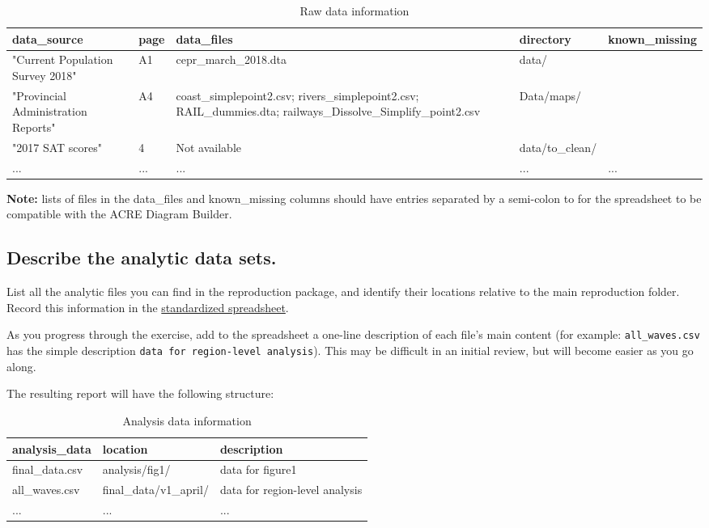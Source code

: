 \documentclass[]{book}
\begin{document}
\begin{table}

\caption{\label{tab:raw-data-information}Raw data information}
\centering
\begin{tabu} to 
\hline
data\_source & page & data\_files & directory & known\_missing\\
\hline
"Current Population Survey 2018" & A1 & cepr\_march\_2018.dta & data/ & \\
\hline
"Provincial Administration Reports" & A4 & coast\_simplepoint2.csv; rivers\_simplepoint2.csv; RAIL\_dummies.dta; railways\_Dissolve\_Simplify\_point2.csv & Data/maps/ & \\
\hline
"2017 SAT scores" & 4 & Not available & data/to\_clean/ & \\
\hline
... & ... & ... & ... & ...\\
\hline
\end{tabu}
\end{table}

\textbf{Note:} lists of files in the data\_files and known\_missing columns should have entries separated by a semi-colon to for the spreadsheet to be compatible with the ACRE Diagram Builder.

\hypertarget{desc-analy}{%
\subsection{Describe the analytic data sets.}\label{desc-analy}}

List all the analytic files you can find in the reproduction package, and identify their locations relative to the main reproduction folder. Record this information in the \href{https://docs.google.com/spreadsheets/d/1LUIdVFH0OfR70C7z07TYeE-uWzKI_JIeWUMaYhqEKK0/edit\#gid=1299317837\&range=A1}{standardized spreadsheet}.

As you progress through the exercise, add to the spreadsheet a one-line description of each file's main content (for example: \texttt{all\_waves.csv} has the simple description \texttt{data\ for\ region-level\ analysis}). This may be difficult in an initial review, but will become easier as you go along.

The resulting report will have the following structure:

\begin{table}

\caption{\label{tab:analysis-data-information}Analysis data information}
\centering
\begin{tabu} to 
\hline
analysis\_data & location & description\\
\hline
final\_data.csv & analysis/fig1/ & data for figure1\\
\hline
all\_waves.csv & final\_data/v1\_april/ & data for region-level analysis\\
\hline
... & ... & ...\\
\hline
\end{tabu}
\end{table}
\end{document}

